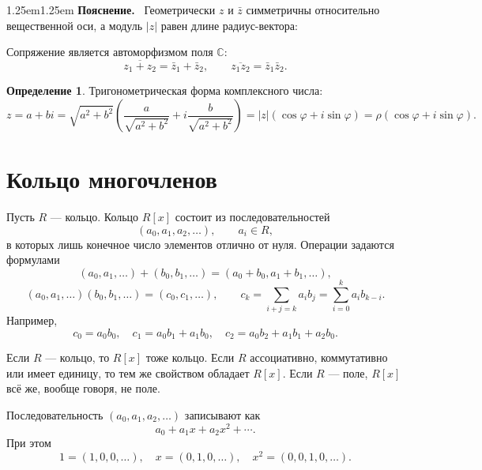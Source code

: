\documentclass[12pt,a4paper,oneside,openany]{book}
\theoremstyle{definition}
\newtheorem{definition}{Определение}[chapter]
\theoremstyle{plain}
\theoremstyle{remark}
\newenvironment{explanation}
  {\begin{adjustwidth}{1.25em}{1.25em}\small
   \noindent\textcolor{logicteal}{\sffamily\bfseries Пояснение.}\ }
  {\par\end{adjustwidth}}
\newcommand{\C}{\mathbb{C}}
\begin{document}
\begin{explanation}
Геометрически $z$ и $\bar z$ симметричны относительно вещественной оси,
а модуль $|z|$ равен длине радиус-вектора:
\end{explanation}

\begin{center}
\end{center}


Сопряжение является автоморфизмом поля $\C$:
\[
  \overline{z_1+z_2}=\bar z_1+\bar z_2,
  \qquad
  \overline{z_1z_2}=\bar z_1\bar z_2.
\]

\begin{definition}
Тригонометрическая форма комплексного числа:
\[
  z=a+bi
   =\sqrt{a^2+b^2}
    \left(\frac{a}{\sqrt{a^2+b^2}}
    +i\frac{b}{\sqrt{a^2+b^2}}\right)
   =|z|(\cos\varphi+i\sin\varphi)
   =\rho(\cos\varphi+i\sin\varphi).
\]
\end{definition}


\chapter{Кольцо многочленов}

Пусть $R$ --- кольцо. Кольцо $R[x]$ состоит из последовательностей
\[
  (a_0,a_1,a_2,\ldots),\qquad a_i\in R,
\]
в которых лишь конечное число элементов отлично от нуля. Операции
задаются формулами
\[
  (a_0,a_1,\ldots)+(b_0,b_1,\ldots)
  =(a_0+b_0,a_1+b_1,\ldots),
\]
\[
  (a_0,a_1,\ldots)(b_0,b_1,\ldots)
  =(c_0,c_1,\ldots),
  \qquad
  c_k=\sum_{i+j=k}a_i b_j=\sum_{i=0}^{k}a_i b_{k-i}.
\]
Например,
\[
  c_0=a_0b_0,
  \quad c_1=a_0b_1+a_1b_0,
  \quad c_2=a_0b_2+a_1b_1+a_2b_0.
\]

Если $R$ --- кольцо, то $R[x]$ тоже кольцо. Если $R$ ассоциативно,
коммутативно или имеет единицу, то тем же свойством обладает $R[x]$.
Если $R$ --- поле, $R[x]$ всё же, вообще говоря, не поле.

Последовательность $(a_0,a_1,a_2,\ldots)$ записывают как
\[
  a_0+a_1x+a_2x^2+\cdots.
\]
При этом
\[
  1=(1,0,0,\ldots),\quad
  x=(0,1,0,\ldots),\quad
  x^2=(0,0,1,0,\ldots).
\]
\end{document}
